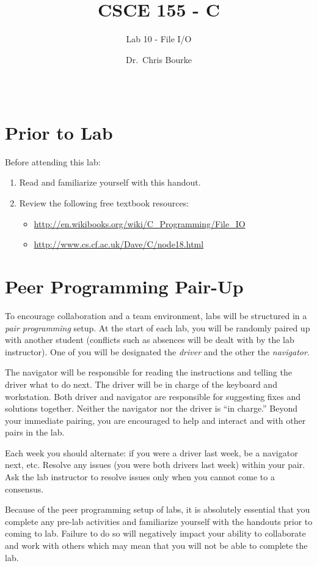 \documentclass[12pt]{scrartcl}
\title{CSCE 155 - C}
\subtitle{Lab 10 - File I/O}
\author{Dr.\ Chris Bourke}
\date{~}
\begin{document}
\maketitle

\section*{Prior to Lab}

Before attending this lab:
\begin{enumerate}
  \item Read and familiarize yourself with this handout.
  \item Review the following free textbook resources:
	\begin{itemize}
  	  \item \url{http://en.wikibooks.org/wiki/C_Programming/File_IO}
	  \item \url{http://www.cs.cf.ac.uk/Dave/C/node18.html}
	\end{itemize}
\end{enumerate}

\section*{Peer Programming Pair-Up}

To encourage collaboration and a team environment, labs will be
structured in a \emph{pair programming} setup.  At the start of
each lab, you will be randomly paired up with another student 
(conflicts such as absences will be dealt with by the lab instructor).
One of you will be designated the \emph{driver} and the other
the \emph{navigator}.  

The navigator will be responsible for reading the instructions and
telling the driver what to do next.  The driver will be in charge of the
keyboard and workstation.  Both driver and navigator are responsible
for suggesting fixes and solutions together.  Neither the navigator
nor the driver is ``in charge.''  Beyond your immediate pairing, you
are encouraged to help and interact and with other pairs in the lab.

Each week you should alternate: if you were a driver last week, 
be a navigator next, etc.  Resolve any issues (you were both drivers
last week) within your pair.  Ask the lab instructor to resolve issues
only when you cannot come to a consensus.  

Because of the peer programming setup of labs, it is absolutely 
essential that you complete any pre-lab activities and familiarize
yourself with the handouts prior to coming to lab.  Failure to do
so will negatively impact your ability to collaborate and work with 
others which may mean that you will not be able to complete the
lab.  
\end{document}
